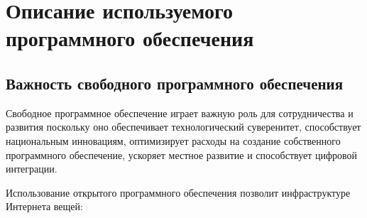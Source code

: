 
\section{Описание используемого программного обеспечения}

\subsection{Важность свободного программного обеспечения}

Свободное программное обеспечение играет важную роль для сотрудничества и 
развития поскольку оно обеспечивает технологический суверенитет,
способствует национальным инновациям, оптимизирует расходы на создание 
собственного программного обеспечение, ускоряет местное развитие и 
способствует цифровой интеграции. 

Использование открытого программного обеспечения позволит инфраструктуре 
Интернета вещей:

